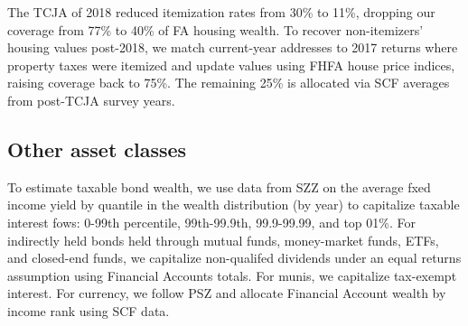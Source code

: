 \documentclass[12pt]{article}
\begin{document}
The TCJA of 2018 reduced itemization rates from 30\% to 11\%, dropping our coverage from 77\% to 40\% of FA housing wealth. To recover non-itemizers' housing values post-2018, we match current-year addresses to 2017 returns where property taxes were itemized and update values using FHFA house price indices, raising coverage back to 75\%. The remaining 25\% is allocated via SCF averages from post-TCJA survey years.

\subsection{Other asset classes}

To estimate taxable bond wealth, we use data from SZZ on the average fxed income yield by quantile in the wealth
distribution (by year) to capitalize taxable interest fows: 0-99th percentile, 99th-99.9th, 99.9-99.99, and top 01\%. For indirectly held bonds held through mutual funds, money-market funds, ETFs, and closed-end funds, we capitalize non-qualifed dividends under an equal returns assumption using Financial Accounts totals. For munis, we capitalize tax-exempt interest. For currency, we follow PSZ and allocate Financial Account wealth by income rank using SCF data.




\end{document}
